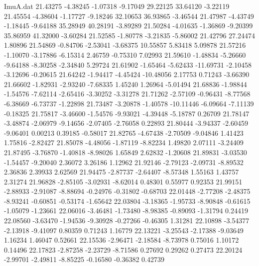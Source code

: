 \begin{filecontents}{ImuA.dat}
  21.43275   -4.38245   -1.07318   -9.17049   29.22125   33.64120   -3.22119
  21.45554   -4.38604   -1.17727   -9.18246   32.10653   36.93865   -3.46544
  21.47987   -4.43749   -1.18445   -9.64188   35.28949   40.28191   -3.89289
  21.50284   -4.01635   -1.36869   -9.20399   35.86959   41.32000   -3.60284
  21.52585   -1.80778   -3.21835   -5.86002   21.42796   27.24474    1.80896
  21.54869   -0.84706   -2.53041   -3.68375   10.55857    5.83418    5.09878
  21.57216   -1.10070   -3.17886   -6.15314    2.46759   -0.75310    7.02993
  21.59610   -1.48834   -5.26660   -9.64188   -8.30258   -2.34840    5.29724
  21.61902   -1.65464   -5.62433  -11.69731   -2.10458   -3.12696   -0.20615
  21.64242   -1.94417   -4.45424  -10.48056    2.17753    0.71243   -3.66390
  21.66602   -1.82931   -2.93240   -7.68335    1.45240    1.26964   -5.01494
  21.68836   -1.98844   -1.54576   -7.62114   -2.65416   -3.30252   -3.31278
  21.71262   -2.57109   -0.96431   -8.77568   -6.38669   -6.73737   -1.22898
  21.73487   -3.20878   -1.40578  -10.11446   -6.09664   -7.11139   -0.18325
  21.75817   -3.46600   -1.54576   -9.93021   -4.39448   -5.18787    0.26709
  21.78147   -3.48874   -2.06979   -9.14656   -2.07405   -2.76058    0.22893
  21.80444   -3.94337   -2.60459   -9.06401    0.00213    0.39185   -0.58017
  21.82765   -4.67438   -2.70509   -9.04846    1.41423    1.75816   -2.82427
  21.85078   -4.48056   -1.87119   -8.82234    1.49820    2.07111   -3.24409
  21.87495   -3.76870   -1.40818   -8.98026    1.65849    2.62832   -1.20608
  21.89831   -3.03530   -1.54457   -9.20040    2.36072    3.26186    1.12962
  21.92146   -2.79123   -2.09731   -8.89532    2.36836    2.39933    2.62569
  21.94475   -2.87737   -2.64407   -8.57348    1.55163    1.43757    2.31274
  21.96828   -2.85105   -3.02931   -8.62014    0.48301    0.55977    0.92353
  21.99151   -2.88933   -2.91087   -8.88694   -0.24976   -0.31802   -0.68703
  22.01448   -2.77208   -2.48375   -8.93241   -0.60851   -0.53174   -1.65642
  22.03804   -3.18365   -1.95733   -8.90848   -0.61615   -1.05079   -1.23661
  22.06016   -3.46481   -1.73480   -8.98385   -0.89093   -1.31794    0.24419
  22.08560   -3.63470   -1.94536   -9.30928   -0.27266   -0.46305    1.31281
  22.10898   -3.54377   -2.13918   -9.41097    0.80359    0.71243    1.16779
  22.13221   -3.25543   -2.17388   -9.03649    1.16234    1.46047    0.52661
  22.15536   -2.96471   -2.18584   -8.73978    0.75016    1.10172    0.14496
  22.17823   -2.87258   -2.23729   -8.71586    0.27692    0.29262    0.27473
  22.20124   -2.99701   -2.49811   -8.85225   -0.16580   -0.36382    0.42739

\end{filecontents}
